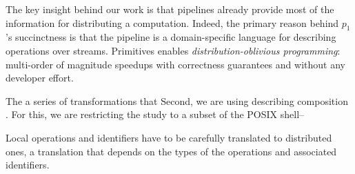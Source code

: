 \documentclass[sigplan,10pt,review,anonymous]{acmart}
\newcommand{\eg}{{\em e.g.}, }
\begin{document}
% 
% 
% 
% 
% 
% 
% 
% 







The key insight behind our work is that \unix pipelines already provide most of the information for distributing a computation.
Indeed, the primary reason behind $p_1$'s succinctness is that the pipeline is a domain-specific language for describing operations over streams.
Primitives 
\sys enables \emph{distribution-oblivious programming}: 
  multi-order of magnitude speedups with correctness guarantees and without any developer effort.

The a series of transformations that 
Second, we are using describing composition . For this, we are restricting the study to a subset of the POSIX shell--

Local operations and identifiers have to be carefully translated to distributed ones, a translation that depends on the types of the operations and associated identifiers.
\end{document}
